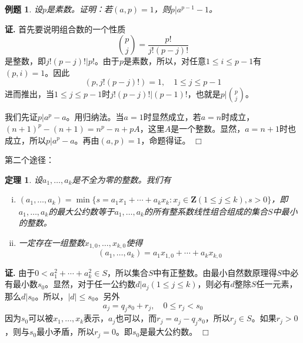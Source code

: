 \documentclass{ctexart}
\newcommand{\aabs}[1]{{ \left| #1 \right| }}
\newcommand{\Z}{\boldsymbol{Z}}
\newtheorem{thrm}{定理}[section]
\newtheorem{exmp}{例题}[section]
\renewenvironment{proof}[1][证]{\noindent \textbf{#1.} }{\hfill$\Box$}
\begin{document}
\begin{exmp}
设$p$是素数。证明：若$(a,p)=1$，则$p|a^{p-1}-1$。
\end{exmp}
\begin{proof}
首先要说明组合数的一个性质
\begin{displaymath}
\binom{p}{j}=\frac{p!}{j!(p-j)!}
\end{displaymath}
是整数，即$j!(p-j)!|p!$。由于$p$是素数，所以，对任意$1\leq i\leq p-1$有$(p,i)=1$。因此
\begin{displaymath}
(p,j!(p-j)!)=1,\quad 1\leq j\leq p-1
\end{displaymath}
进而推出，当$1\leq j\leq p-1$时$j!(p-j)!|(p-1)!$，也就是$p|\binom{p}{j}$。

我们先证$p|a^p-a$。用归纳法。当$a=1$时显然成立，若$a=n$时成立，$(n+1)^p-(n+1)=n^p-n+pA$，这里$A$是一个整数。显然，$a=n+1$时也成立，所以$p|a^p-a$。再由$(a,p)=1$，命题得证。
\end{proof}

第二个途径：
\begin{thrm}
设$a_1,\dotsc,a_k$是不全为零的整数。我们有
\begin{enumerate}[(i)]
\item $(a_1,\dotsc,a_k)=\min\{s=a_1x_1+\dotsb+a_k x_k : x_j\in \Z(1\leq j\leq k),s>0\}$，即$a_1,\dotsc,a_k$的最大公约数等于$a_1,\dotsc,a_k$的所有整系数线性组合组成的集合$S$中最小的整数。
\item 一定存在一组整数$x_{1,0},\dotsc,x_{k,0}$使得
\begin{equation}
(a_1,\dotsc,a_k)=a_1 x_{1,0}+\dotsb+a_k x_{k,0}
\end{equation}
\end{enumerate}
\end{thrm}
\begin{proof}
由于$0<a_1^2 +\dotsb+a_k^2\in S$，所以集合$S$中有正整数。由最小自然数原理得$S$中必有最小数$s_0$。显然，对于任一公约数$d|a_j(1\leq j\leq k)$，则必有$d$整除$S$任一元素，那么$d|s_0$。所以，$\aabs{d}\leq s_0$。另外
\begin{displaymath}
a_j=q_j s_0+r_j,\quad 0\leq r_j<s_0
\end{displaymath}
因为$s_0$可以被$x_1,\dotsc,x_k$表示，$a_j$也可以，而$r_j=a_j-q_j s_0$，所以$r_j\in S$。如果$r_j>0$，则与$s_0$最小矛盾，所以$r_j=0$。即$s_0$是最大公约数。
\end{proof}
\end{document}
